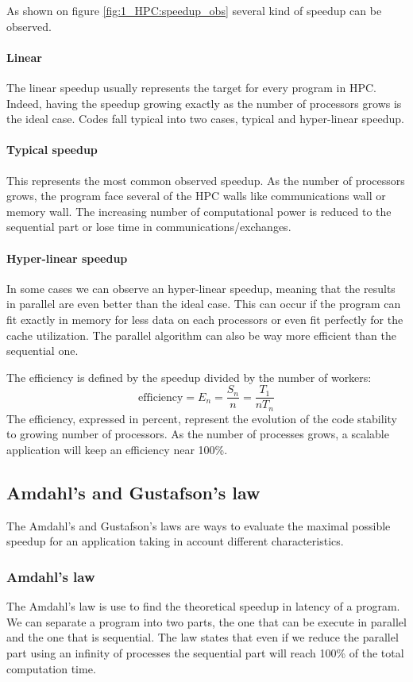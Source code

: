 As shown on figure \ref{fig:1_HPC:speedup_obs} several kind of speedup can be observed. 
\paragraph{Linear}
The linear speedup usually represents the target for every program in HPC. 
Indeed, having the speedup growing exactly as the number of processors grows is the ideal case. 
Codes fall typical into two cases, typical and hyper-linear speedup. 
\paragraph{Typical speedup}
This represents the most common observed speedup. 
As the number of processors grows, the program face several of the HPC walls like communications wall or memory wall. 
The increasing number of computational power is reduced to the sequential part or lose time in communications/exchanges. 
\paragraph{Hyper-linear speedup}
In some cases we can observe an hyper-linear speedup, meaning that the results in parallel are even better than the ideal case. 
This can occur if the program can fit exactly in memory for less data on each processors or even fit perfectly for the cache utilization. 
The parallel algorithm can also be way more efficient than the sequential one. 

The efficiency is defined by the speedup divided by the number of workers: 
\begin{equation}
\text{efficiency} = E_n = \frac{S_n}{n} = \frac{T_1}{nT_n}
\end{equation}
The efficiency, expressed in percent, represent the evolution of the code stability to growing number of processors. 
As the number of processes grows, a scalable application will keep an efficiency near 100\%.

\subsection{Amdahl's and Gustafson's law}
The Amdahl's and Gustafson's laws are ways to evaluate the maximal possible speedup for an application taking in account different characteristics. 

\subsubsection{Amdahl's law}
The Amdahl's law\cite{amdahl1967validity} is use to find the theoretical speedup in latency of a program.
We can separate a program into two parts, the one that can be execute in parallel and the one that is sequential. 
The law states that even if we reduce the parallel part using an infinity of processes the sequential part will reach 100\% of the total computation time. 

